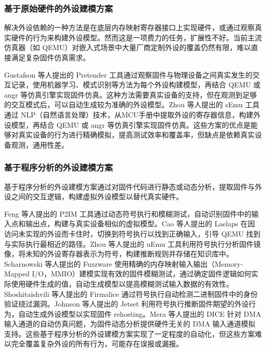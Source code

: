 \subsubsection{基于原始硬件的外设建模方案}

解决外设依赖的一种方法是在底层内存映射寄存器接口上实现硬件，或通过观察真实硬件的行为来构建外设模型。然而这是一项费力的任务，扩展性不好。当前主流仿真器（如 QEMU）对嵌入式场景中大量厂商定制外设的覆盖仍然有限，难以直接满足复杂固件仿真需求。

Gustafson 等人提出的 Pretender\cite{pretender} 工具通过观察固件与物理设备之间真实发生的交互记录，使用机器学习、模式识别等方法为每个外设构建模型，再结合 QEMU 或 angr\cite{angr2017} 等仿真引擎实现固件仿真。这种方法需要真实设备的支持，但在观测到足够的交互模式后，可以自动生成较为准确的外设模型。Zhou 等人提出的 sEmu\cite{zhou2022semu} 工具通过 NLP（自然语言处理）技术，从MCU手册中提取外设的寄存器信息，构建外设模型，再结合 QEMU 或 angr 等仿真引擎实现固件仿真。这些方案的优点是能够对真实设备的行为进行精确模拟，提高测试效率和覆盖率，但缺点是依赖真实设备观测，通用性差。

\subsubsection{基于程序分析的外设建模方案}

基于程序分析的外设建模方案通过对固件代码进行静态或动态分析，提取固件与外设之间的交互逻辑，构建虚拟外设模型以替代真实硬件。

Feng 等人提出的 P2IM\cite{fengp2020p2im} 工具通过动态符号执行和模糊测试，自动识别固件中的输入点和输出点，构建与真实设备相似的虚拟模型。Cao 等人提出的 Laelaps\cite{laelaps} 在因访问未实现的外设而卡住时，切换到符号执行以找到正确输入，引导 QEMU 找到与实际执行最相近的路径。Zhou 等人提出的 uEmu\cite{uemu} 工具利用符号执行分析固件镜像，将未知的外设寄存器表示为符号，构建推断规则并存储在知识库中。Scharnowski 等人提出的 Fuzzware\cite{fuzzware} 使用精确的内存映射输入输出（Memory-Mapped I/O，MMIO）建模实现有效的固件模糊测试，通过确定固件逻辑如何实际使用硬件生成的值，自动生成模型以提高模糊测试输入数据的有效性。Shoshitaishvili 等人提出的 Firmalice\cite{firmalice} 通过符号执行自动检测二进制固件中的身份验证绕过漏洞。Johnson 等人提出的 Jetset\cite{johnson_jetset_2021} 利用符号执行推断固件期望的外设行为，自动生成外设模型以实现固件 rehosting。Mera 等人提出的 DICE\cite{mera_dice_2021} 针对 DMA 输入通道的自动仿真问题，为固件动态分析提供硬件无关的 DMA 输入通道模拟支持。这些基于程序分析的外设建模方案实现了一定程度的自动化，但这些方案难以完全覆盖复杂外设的所有行为，可能存在误报或漏报。

